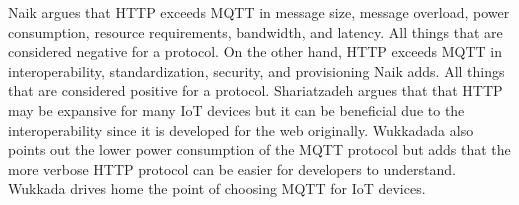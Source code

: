 Naik argues that HTTP exceeds MQTT in message size, message overload, power consumption, resource requirements, bandwidth, and latency. 
All things that are considered negative for a protocol.
On the other hand, HTTP exceeds MQTT in interoperability, standardization, security, and provisioning Naik adds.\cite{Naik2017}
All things that are considered positive for a protocol.
Shariatzadeh argues that that HTTP may be expansive for many IoT devices but it can be beneficial due to the interoperability since it is developed for the web originally.\cite{Shariatzadeh2016}
Wukkadada also points out the lower power consumption of the MQTT protocol but adds that the more verbose HTTP protocol can be easier for developers to understand.
Wukkada drives home the point of choosing MQTT for IoT devices.\cite{Wukkadada2018}